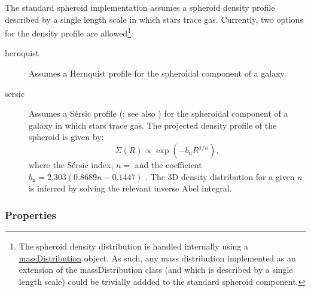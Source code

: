 The standard spheroid implementation assumes a spheroid density profile described by a single length scale in which stars trace gas. Currently, two options for the density profile are allowed\footnote{The spheroid density distribution is handled internally using a \href{https://github.com/galacticusorg/galacticus/releases/download/masterRelease/Galacticus_Development.pdf\#methods.massDistribution}{\normalfont \ttfamily massDistribution} object. As such, any mass distribution implemented as an extension of the {\normalfont \ttfamily massDistribution} class (and which is described by a single length scale) could be trivially addded to the standard spheroid component.}:
\begin{description}
\item [{\normalfont \ttfamily hernquist}] Assumes a Hernquist profile \citep{hernquist_analytical_1990} for the spheroidal \gls{component} of a galaxy.
\item [{\normalfont \ttfamily sersic}] Assumes a S\'ersic profile (\citealt{sersic_influence_1963}; see also \citealt{mazure_exact_2002}) for the spheroidal \gls{component} of a galaxy in which stars trace gas. The projected density profile of the spheroid is given by:
\begin{equation}
 \Sigma(R) \propto \exp\left(-b_\mathrm{n} R^{1/n} \right),
\end{equation}
where the S\'ersic index, $n=${\normalfont \ttfamily [spheroidSersicIndex]} and the coefficient $b_\mathrm{n}=2.303(0.8689 n-0.1447)$ \cite{wadadekar_two-dimensional_1999}. The 3D density distribution for a given $n$ is inferred by solving the relevant inverse Abel integral.
\end{description}

\subsubsection{Properties}

